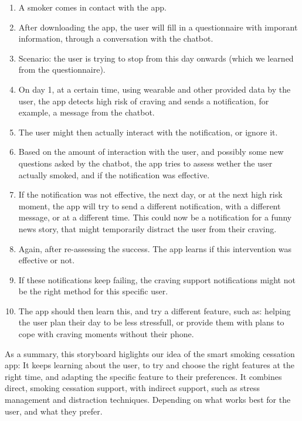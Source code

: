 \begin{enumerate}
    \item A smoker comes in contact with the app.
    \item After downloading the app, the user will fill in a questionnaire with imporant information, through a conversation with the chatbot.
    \item Scenario: the user is trying to stop from this day onwards (which we learned from the questionnaire).
    \item On day 1, at a certain time, using wearable and other provided data by the user, the app detects high risk of craving and sends a notification, for example, a message from the chatbot.
    \item The user might then actually interact with the notification, or ignore it.
    \item Based on the amount of interaction with the user, and possibly some new questions asked by the chatbot, the app tries to assess wether the user actually smoked, and if the notification was effective.
    \item If the notification was not effective, the next day, or at the next high risk moment, the app will try to send a different notification, with a different message, or at a different time. This could now be a notification for a funny news story, that might temporarily distract the user from their craving.
    \item Again, after re-assessing the success. The app learns if this intervention was effective or not.
    \item If these notifications keep failing, the craving support notifications might not be the right method for this specific user.
    \item The app should then learn this, and try a different feature, such as: helping the user plan their day to be less stressfull, or provide them with plans to cope with craving moments without their phone.

\end{enumerate}

As a summary, this storyboard higlights our idea of the smart smoking cessation app:
It keeps learning about the user, to try and choose the right features at the right time, and adapting the specific feature to their preferences.
It combines direct, smoking cessation support, with indirect support, such as stress management and distraction techniques. Depending on what works best for the user, and what they prefer.

